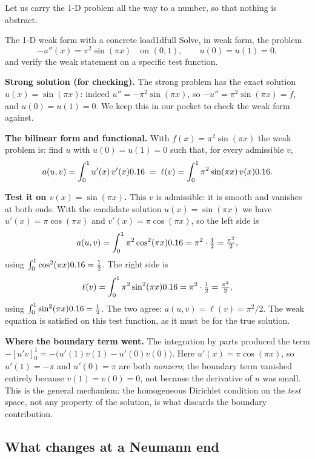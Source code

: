 Let us carry the 1-D problem all the way to a number, so that nothing is
abstract.

\begin{workedexample}{The 1-D weak form with a concrete load}{1dfull}
Solve, in weak form, the problem
\[
  -u''(x) = \pi^2\sin(\pi x) \quad\text{on } (0,1), \qquad u(0)=u(1)=0,
\]
and verify the weak statement on a specific test function.

\medskip\noindent\textbf{Strong solution (for checking).}
The strong problem has the exact solution $u(x)=\sin(\pi x)$: indeed
$u''=-\pi^2\sin(\pi x)$, so $-u'' = \pi^2\sin(\pi x)=f$, and $u(0)=u(1)=0$. We
keep this in our pocket to check the weak form against.

\medskip\noindent\textbf{The bilinear form and functional.}
With $f(x)=\pi^2\sin(\pi x)$ the weak problem is: find $u$ with $u(0)=u(1)=0$ such
that, for every admissible $v$,
\[
  a(u,v)=\int_0^1 u'(x)\,v'(x)0.16
  \;=\;
  \ell(v)=\int_0^1 \pi^2\sin(\pi x)\,v(x)0.16.
\]

\medskip\noindent\textbf{Test it on $v(x)=\sin(\pi x)$.}
This $v$ is admissible: it is smooth and vanishes at both ends. With the candidate
solution $u(x)=\sin(\pi x)$ we have $u'(x)=\pi\cos(\pi x)$ and
$v'(x)=\pi\cos(\pi x)$, so the left side is
\[
  a(u,v)=\int_0^1 \pi^2\cos^2(\pi x)0.16
  = \pi^2\cdot\tfrac12 = \tfrac{\pi^2}{2},
\]
using $\int_0^1\cos^2(\pi x)0.16=\tfrac12$. The right side is
\[
  \ell(v)=\int_0^1 \pi^2\sin^2(\pi x)0.16
  = \pi^2\cdot\tfrac12 = \tfrac{\pi^2}{2},
\]
using $\int_0^1\sin^2(\pi x)0.16=\tfrac12$. The two agree: $a(u,v)=\ell(v)=\pi^2/2$.
The weak equation is satisfied on this test function, as it must be for the true
solution.

\medskip\noindent\textbf{Where the boundary term went.}
The integration by parts produced the term $-[u'v]_0^1 = -\bigl(u'(1)v(1) -
u'(0)v(0)\bigr)$. Here $u'(x)=\pi\cos(\pi x)$, so $u'(1)=-\pi$ and $u'(0)=\pi$ are
both \emph{nonzero}; the boundary term vanished entirely because $v(1)=v(0)=0$,
not because the derivative of $u$ was small. This is the general mechanism: the
homogeneous Dirichlet condition on the \emph{test} space, not any property of the
solution, is what discards the boundary contribution.
\end{workedexample}

\subsection{What changes at a Neumann end}
\label{sec:1d-neumann}

